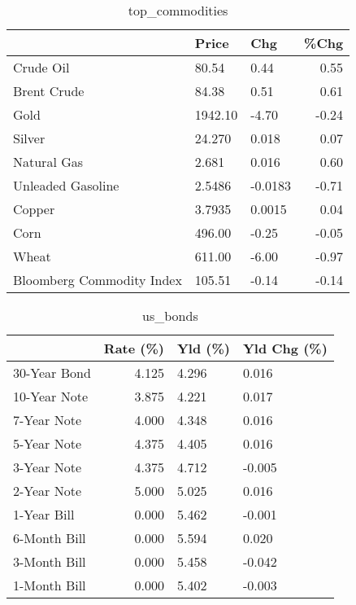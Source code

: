 \documentclass{article}%
\begin{document}
\begin{table}[htbp]%
\caption{top\_commodities}%
\centering%
\begin{adjustbox}{width=1\textwidth}%
\begin{tabular}{lllr}
\toprule
                          &   Price &     Chg &  \%Chg \\
\midrule
               Crude Oil  &   80.54 &    0.44 &  0.55 \\
             Brent Crude  &   84.38 &    0.51 &  0.61 \\
                    Gold  & 1942.10 &   -4.70 & -0.24 \\
                  Silver  &  24.270 &   0.018 &  0.07 \\
             Natural Gas  &   2.681 &   0.016 &  0.60 \\
       Unleaded Gasoline  &  2.5486 & -0.0183 & -0.71 \\
                  Copper  &  3.7935 &  0.0015 &  0.04 \\
                    Corn  &  496.00 &   -0.25 & -0.05 \\
                   Wheat  &  611.00 &   -6.00 & -0.97 \\
Bloomberg Commodity Index &  105.51 &   -0.14 & -0.14 \\
\bottomrule
\end{tabular}
%
\end{adjustbox}%
\end{table}

%


\begin{table}[htbp]%
\caption{us\_bonds}%
\centering%
\begin{adjustbox}{width=1\textwidth}%
\begin{tabular}{lrll}
\toprule
             &  Rate (\%) & Yld (\%) & Yld Chg (\%) \\
\midrule
30-Year Bond &     4.125 &   4.296 &       0.016 \\
10-Year Note &     3.875 &   4.221 &       0.017 \\
 7-Year Note &     4.000 &   4.348 &       0.016 \\
 5-Year Note &     4.375 &   4.405 &       0.016 \\
 3-Year Note &     4.375 &   4.712 &      -0.005 \\
 2-Year Note &     5.000 &   5.025 &       0.016 \\
 1-Year Bill &     0.000 &   5.462 &      -0.001 \\
6-Month Bill &     0.000 &   5.594 &       0.020 \\
3-Month Bill &     0.000 &   5.458 &      -0.042 \\
1-Month Bill &     0.000 &   5.402 &      -0.003 \\
\bottomrule
\end{tabular}
%
\end{adjustbox}%
\end{table}
\end{document}
